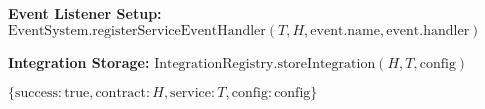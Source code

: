 \begin{protocol}
\begin{algorithmic}[1]
\State \textbf{Event Listener Setup:}
    \State $\text{EventSystem}.\text{registerServiceEventHandler}(T, H, \text{event}.\text{name}, \text{event}.\text{handler})$
\EndFor

\State \textbf{Integration Storage:}
\State $\text{IntegrationRegistry}.\text{storeIntegration}(H, T, \text{config})$

\State \Return $\{\text{success}: \text{true}, \text{contract}: H, \text{service}: T, \text{config}: \text{config}\}$
\end{algorithmic}
\end{protocol}
